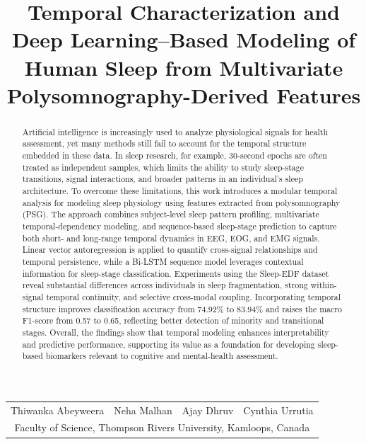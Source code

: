 \documentclass[10pt]{cai26}
\begin{document}
\def\conferenceyear{2026}
\begin{center}

\title{Temporal Characterization and Deep Learning--Based Modeling of Human Sleep from Multivariate Polysomnography-Derived Features}
\maketitle

\thispagestyle{empty}

\begin{tabular}{cccc}
Thiwanka Abeyweera\upstairs{\affilone,*} &
Neha Malhan\upstairs{\affilone} &
Ajay Dhruv\upstairs{\affilone} &
Cynthia Urrutia\upstairs{\affilone}
\\[0.25ex]
\multicolumn{4}{c}{{\small \upstairs{\affilone} Faculty of Science, Thompson Rivers University, Kamloops, Canada}}
\end{tabular}

\vspace*{0.1in}
\end{center}

\begin{abstract}
Artificial intelligence is increasingly used to analyze physiological signals for health assessment, yet many methods still fail to account for the temporal structure embedded in these data. In sleep research, for example, 30-second epochs are often treated as independent samples, which limits the ability to study sleep-stage transitions, signal interactions, and broader patterns in an individual's sleep architecture. To overcome these limitations, this work introduces a modular temporal analysis for modeling sleep physiology using features extracted from polysomnography (PSG). The approach combines subject-level sleep pattern profiling, multivariate temporal-dependency modeling, and sequence-based sleep-stage prediction to capture both short- and long-range temporal dynamics in EEG, EOG, and EMG signals. Linear vector autoregression is applied to quantify cross-signal relationships and temporal persistence, while a Bi-LSTM sequence model leverages contextual information for sleep-stage classification. Experiments using the Sleep-EDF dataset reveal substantial differences across individuals in sleep fragmentation, strong within-signal temporal continuity, and selective cross-modal coupling. Incorporating temporal structure improves classification accuracy from 74.92\% to 83.94\% and raises the macro F1-score from 0.57 to 0.65, reflecting better detection of minority and transitional stages. Overall, the findings show that temporal modeling enhances interpretability and predictive performance, supporting its value as a foundation for developing sleep-based biomarkers relevant to cognitive and mental-health assessment.
\end{abstract}
\end{document}
